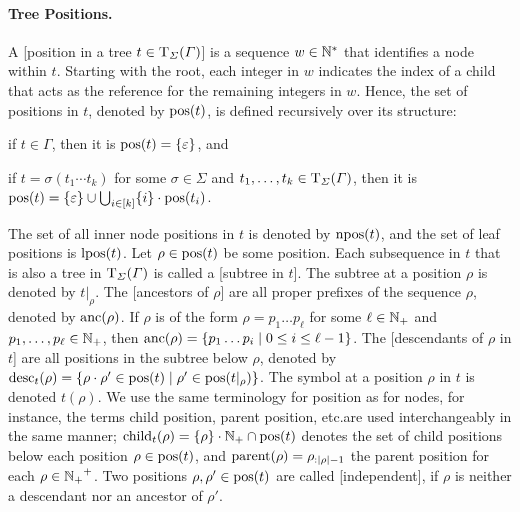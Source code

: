 \documentclass[../document.tex]{subfiles}
\begin{document}
    \paragraph{Tree Positions.}
    A [position in a tree \(t \in \operatorname{T}_\varSigma(\varGamma)\)] is a sequence $w \in \mathbb{N}^*$ that identifies a node within \(t\).
    Starting with the root, each integer in \(w\) indicates the index of a child that acts as the reference for the remaining integers in \(w\).
    Hence, the set of positions in \(t\), denoted by \(\operatorname{pos}(t)\), is defined recursively over its structure:
    \begin{inparaenum}
        \item if \(t \in \varGamma\), then it is \(\operatorname{pos}(t) = \{\varepsilon\}\), and
        \item if \(t = \sigma(t_1 \cdots t_k)\) for some \(\sigma\in \varSigma\) and \(t_1, \ldots, t_k \in \operatorname{T}_\varSigma(\varGamma)\), then it is \(\operatorname{pos}(t) = \{\varepsilon\} \cup \bigcup_{i\in[k]} \{i\}\cdot \operatorname{pos}(t_i)\).
    \end{inparaenum}
    The set of all inner node positions in \(t\) is denoted by \(\operatorname{npos}(t)\), and the set of leaf positions is \(\operatorname{lpos}(t)\).
    Let \(\rho \in \operatorname{pos}(t)\) be some position.
    Each subsequence in \(t\) that is also a tree in \(\operatorname{T}_\varSigma(\varGamma)\) is called a [subtree in \(t\)].
    The subtree at a position \(\rho\) is denoted by \(t|_\rho\).
    The [ancestors of \(\rho\)] are all proper prefixes of the sequence \(\rho\), denoted by \(\operatorname{anc}(\rho)\).
    If \(\rho\) is of the form \(\rho = p_1 \ldots p_\ell\) for some \(\ell \in \mathbb{N}_+\) and \(p_1, \ldots, p_\ell \in \mathbb{N}_+\), then \(\operatorname{anc}(\rho) = \{ p_1 \ldots p_i \mid 0 \leq i \leq \ell-1 \}\).
    The [descendants of \(\rho\) in \(t\)] are all positions in the subtree below \(\rho\), denoted by \(\operatorname{desc}_t(\rho) = \{ \rho \cdot \rho' \in \operatorname{pos}(t) \mid \rho' \in \operatorname{pos}(t|_\rho) \}\).
    The symbol at a position \(\rho\) in \(t\) is denoted  \(t(\rho)\).
    We use the same terminology for position as for nodes, for instance, the terms child position, parent position, etc.\@ are used interchangeably in the same manner; \(\operatorname{child}_t(\rho) = \{\rho\} \cdot \mathbb{N}_+ \cap \operatorname{pos}(t)\) denotes the set of child positions below each position \(\rho \in \operatorname{pos}(t)\), and \(\operatorname{parent}(\rho) = \rho_{:|\rho|-1}\) the parent position for each \(\rho \in {\ensuremath{\mathbb{N}}_+}^+\).
    Two positions \(\rho, \rho' \in \operatorname{pos}(t)\) are called [independent], if \(\rho\) is neither a descendant nor an ancestor of \(\rho'\).
\end{document}
